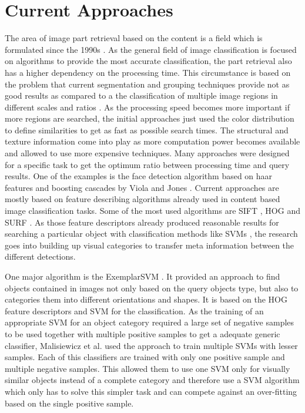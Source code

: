 \chapter{Current Approaches}

The area of image part retrieval based on the content is a field which is formulated since the 1990s \cite{eakins1999content} \cite{rui1997content} \cite{osuna1997training}. As the general field of image classification is focused on algorithms to provide the most accurate classification, the part retrieval also has a higher dependency on the processing time. This circumstance is based on the problem that current segmentation and grouping techniques provide not as good results as compared to a the classification of multiple image regions in different scales and ratios \cite{book:848523}. As the processing speed becomes more important if more regions are searched, the initial approaches just used the color distribution to define similarities to get as fast as possible search times. The structural and texture information come into play as more computation power becomes available and allowed to use more expensive techniques. Many approaches were designed for a specific task to get the optimum ratio between processing time and query results. One of the examples is the face detection algorithm based on haar features and boosting cascades by Viola and Jones \cite{viola2001rapid}. Current approaches are mostly based on feature describing algorithms already used in content based image classification tasks. Some of the most used algorithms are \acf{SIFT} \cite{Lowe2004}, \acf{HOG} \cite{Dalal2005} and \acf{SURF} \cite{bay2008speeded}. As those feature descriptors already produced reasonable results for searching a particular object with classification methods like \aclp{SVM} \cite{cortes1995support}, the research goes into building up visual categories to transfer meta information between the different detections.

One major algorithm is the ExemplarSVM \cite{Malisiewicz2011}. It provided an approach to find objects contained in images not only based on the query objects type, but also to categories them into different orientations and shapes.
It is based on the \ac{HOG} feature descriptors and \ac{SVM} for the classification. As the training of an appropriate \ac{SVM} for an object category required a large set of negative samples to be used together with multiple positive samples to get a adequate generic classifier, Malisiewicz et al. used the approach to train multiple \acp{SVM} with lesser samples. Each of this classifiers are trained with only one positive sample and multiple negative samples. This allowed them to use one \ac{SVM} only for visually similar objects instead of a complete category and therefore use a \ac{SVM} algorithm which only has to solve this simpler task and can compete against an over-fitting based on the single positive sample.%
